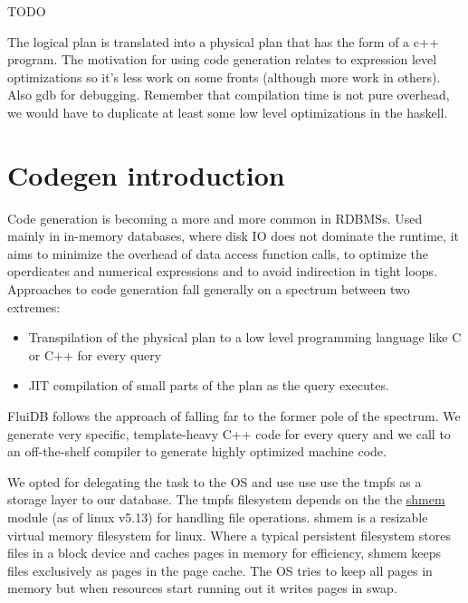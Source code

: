 \begin{summary}
\item TODO
\end{summary}

The logical plan is translated into a physical plan that has the form
of a c++ program. The motivation for using code generation relates to
expression level optimizations so it’s less work on some fronts
(although more work in others). Also gdb for debugging. Remember that
compilation time is not pure overhead, we would have to duplicate at
least some low level optimizations in the haskell.

\section{Codegen introduction}

Code generation is becoming a more and more common in RDBMSs. Used
mainly in in-memory databases, where disk IO does not dominate the
runtime, it aims to minimize the overhead of data access function
calls, to optimize the operdicates and numerical expressions and to
avoid indirection in tight loops. Approaches to code generation fall
generally on a spectrum between two extremes:

\begin{itemize}
\item Transpilation of the physical plan to a low level programming
  language like C or C++ for every query
\item JIT compilation of small parts of the plan as the query
  executes.
\end{itemize}

FluiDB follows the approach of
\cite{krikellasGeneratingCodeHolistic2010} falling far to the former
pole of the spectrum. We generate very specific, template-heavy C++
code for every query and we call to an off-the-shelf compiler to
generate highly optimized machine code.

We opted for delegating the task to the OS and use use use the tmpfs
as a storage layer to our database. The tmpfs filesystem depends on
the the
\href{https://elixir.bootlin.com/linux/latest/source/mm/shmem.c}{shmem}
module (as of linux v5.13) for handling file operations. shmem is a
resizable virtual memory filesystem for linux. Where a typical
persistent filesystem stores files in a block device and caches pages
in memory for efficiency, shmem keeps files exclusively as pages in
the page cache. The OS tries to keep all pages in memory but when
resources start running out it writes pages in swap.

